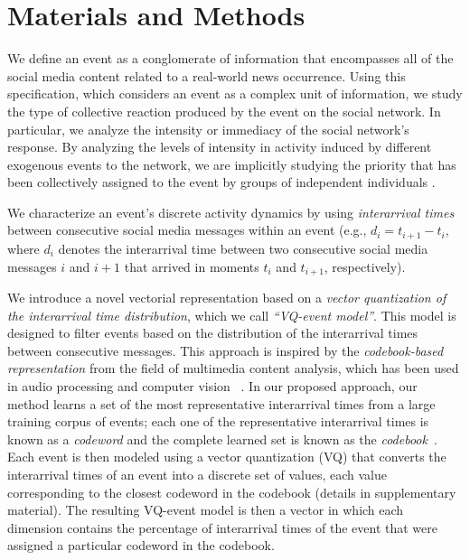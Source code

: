\documentclass[10pt,letterpaper]{article}
\begin{document}

\section*{Materials and Methods}

We define an event as a conglomerate of information that encompasses
all of the social media content related to a real-world news
occurrence. Using this specification, which considers an event as a
complex unit of information, we study the type of collective reaction
produced by the event on the social network. In particular, we analyze 
the intensity or immediacy of the social network's response. 
By analyzing the levels of intensity in activity induced by different exogenous
events to the network, we are implicitly studying the priority that has been
collectively assigned to the event by groups of
independent individuals \cite{barabasi2005origin, karsai2012universal}. 

We characterize an event's discrete activity dynamics by using
\emph{interarrival times} between consecutive social media messages
within an event (e.g., $d_i = t_{i+1}-t_i$, where $d_i$ denotes the
interarrival time between two consecutive social media messages $i$
and $i+1$ that arrived in moments $t_i$ and $t_{i+1}$, respectively).


We introduce a novel vectorial representation based on a {\em vector
quantization of the interarrival time distribution}, which we call 
{\em ``VQ-event model''}. This model is
designed to filter events based on the distribution of the
interarrival times between consecutive messages.  This approach is inspired
by the {\em codebook-based representation} from the field of multimedia
content
analysis, which has been used in audio processing and computer vision
~\cite{ff,Vaizman}.  In our proposed approach, our method learns a set of
the most
representative interarrival times from a large training corpus of events;
each one of the representative interarrival times is known as a
{\em codeword} and the complete learned set is known as the {\em
codebook}~\cite{Vaizman}.  
Each event is then modeled using a vector quantization (VQ) that
converts the interarrival times of an event into a discrete set of values,
each value corresponding to the closest codeword in the codebook (details
in supplementary material).  The resulting VQ-event model is then a
vector in which each dimension contains the percentage of interarrival times
of the event that were assigned a particular codeword in the codebook.
\end{document}
